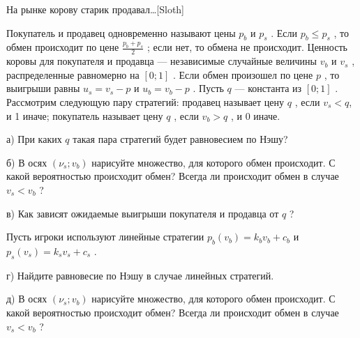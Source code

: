 \begin{problem}
 На рынке корову старик продавал\ldots [Sloth]\par
Покупатель и продавец одновременно называют цены  $p_{b} $  и  $p_{s} $ . Если  $p_{b} \le p_{s} $ , то обмен происходит по цене  $\frac{p_{b} +p_{s} }{2} $ ; если нет, то обмена не происходит. Ценность коровы для покупателя и продавца — независимые случайные величины  $v_{b} $  и  $v_{s} $ , распределенные равномерно на  $\left[0;1\right]$ . Если обмен произошел по цене  $p$ , то выигрыши равны  $u_{s} =v_{s} -p$  и  $u_{b} =v_{b} -p$ .
Пусть  $q$  — константа из  $\left[0;1\right]$ . Рассмотрим следующую пару стратегий: продавец называет цену  $q$ , если  $v_{s} <q$, и 1 иначе; покупатель называет цену  $q$ , если  $v_{b} >q$ , и 0 иначе. \par
а)	При каких  $q$  такая пара стратегий будет равновесием по Нэшу? \par
б)	В осях  $\left(\nu _{s} ;v_{b} \right)$  нарисуйте множество, для которого обмен происходит. С какой вероятностью происходит обмен? Всегда ли происходит обмен в случае  $v_{s} <v_{b} $ ? \par
в)	Как зависят ожидаемые выигрыши покупателя и продавца от  $q$ ?\par
Пусть игроки используют линейные стратегии  $p_{b} \left(v_{b} \right)=k_{b} v_{b} +c_{b} $  и  $p_{s} \left(v_{s} \right)=k_{s} v_{s} +c_{s} $ .\par
г)	Найдите равновесие по Нэшу в случае линейных стратегий. \par
д)	В осях  $\left(\nu _{s} ;v_{b} \right)$  нарисуйте множество, для которого обмен происходит. С какой вероятностью происходит обмен? Всегда ли происходит обмен в случае  $v_{s} <v_{b} $ ?



\begin{sol}

\end{sol}
\end{problem}



